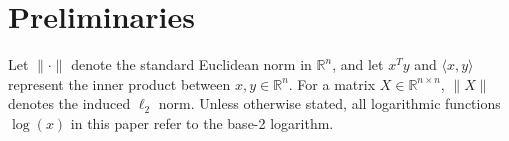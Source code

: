 \documentclass{mcom-l}
\numberwithin{equation}{section}
\begin{document}



\section{Preliminaries}
\label{sec.priliminary}
Let $\|\cdot\|$ denote the standard Euclidean norm in $\mathbb{R}^n$, and let $x^T y$ and $\langle x,y\rangle$ represent the inner product between $x, y \in \mathbb{R}^n$. For a matrix $X \in \mathbb{R}^{n \times n}$, $\|X\|$ denotes the induced $\ell_2$ norm.
Unless otherwise stated, all logarithmic functions $\log(x)$ in this paper refer to the base-2 logarithm.
\end{document}
